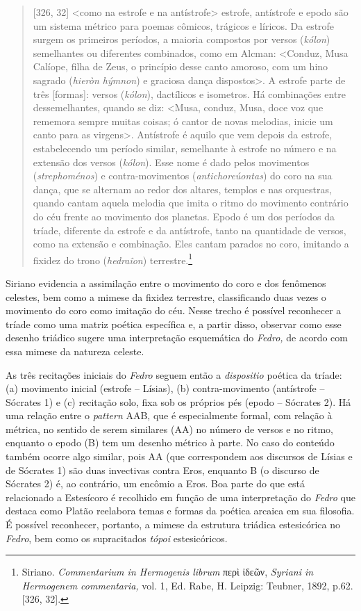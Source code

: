 \begin{quote}
{[}326, 32{]} \textless{}como na estrofe e na antístrofe\textgreater{}
estrofe, antístrofe e epodo são um sistema métrico para poemas cômicos,
trágicos e líricos. Da estrofe surgem os primeiros períodos, a maioria
compostos por versos (\emph{kólon}) semelhantes ou diferentes
combinados, como em Alcman: \textless{}Conduz, Musa Calíope, filha de
Zeus, o princípio desse canto amoroso, com um hino sagrado (\emph{hieròn
hýmnon}) e graciosa dança dispostos\textgreater{}. A estrofe parte de
três {[}formas{]}: versos (\emph{kólon}), dactílicos e isometros. Há
combinações entre dessemelhantes, quando se diz: \textless{}Musa,
conduz, Musa, doce voz que rememora sempre muitas coisas; ó cantor de
novas melodias, inicie um canto para as virgens\textgreater{}.
Antístrofe é aquilo que vem depois da estrofe, estabelecendo um período
similar, semelhante à estrofe no número e na extensão dos versos
(\emph{kólon}). Esse nome é dado pelos movimentos (\emph{strephoménos})
e contra-movimentos (\emph{antichoreúontas}) do coro na sua dança, que
se alternam ao redor dos altares, templos e nas orquestras, quando
cantam aquela melodia que imita o ritmo do movimento contrário do céu
frente ao movimento dos planetas. Epodo é um dos períodos da tríade,
diferente da estrofe e da antístrofe, tanto na quantidade de versos,
como na extensão e combinação. Eles cantam parados no coro, imitando a
fixidez do trono (\emph{hedraîon}) terrestre.\footnote{Siriano.
  \emph{Commentarium in Hermogenis librum} περὶ ἰδεῶν, \emph{Syriani in
  Hermogenem commentaria,} vol. 1, Ed. Rabe, H. Leipzig: Teubner, 1892,
  p.62. {[}326, 32{]}.}
\end{quote}

Siriano evidencia a assimilação entre o movimento do coro e dos
fenômenos celestes, bem como a mimese da fixidez terrestre,
classificando duas vezes o movimento do coro como imitação do céu. Nesse
trecho é possível reconhecer a tríade como uma matriz poética específica
e, a partir disso, observar como esse desenho triádico sugere uma
interpretação esquemática do \emph{Fedro,} de acordo com essa mimese da
natureza celeste.

As três recitações iniciais do \emph{Fedro} seguem então a
\emph{dispositio} poética da tríade: (a) movimento inicial (estrofe --
Lísias), (b) contra-movimento (antístrofe -- Sócrates 1) e (c) recitação
solo, fixa sob os próprios pés (epodo -- Sócrates 2). Há uma relação
entre o \emph{pattern} AAB, que é especialmente formal, com relação à
métrica, no sentido de serem similares (AA) no número de versos e no
ritmo, enquanto o epodo (B) tem um desenho métrico à parte. No caso do
conteúdo também ocorre algo similar, pois AA (que correspondem aos
discursos de Lísias e de Sócrates 1) são duas invectivas contra Eros,
enquanto B (o discurso de Sócrates 2) é, ao contrário, um encômio a
Eros. Boa parte do que está relacionado a Estesícoro é recolhido em
função de uma interpretação do \emph{Fedro} que destaca como Platão
reelabora temas e formas da poética arcaica em sua filosofia. É possível
reconhecer, portanto, a mimese da estrutura triádica estesicórica no
\emph{Fedro}, bem como os supracitados \emph{tópoi} estesicóricos.


